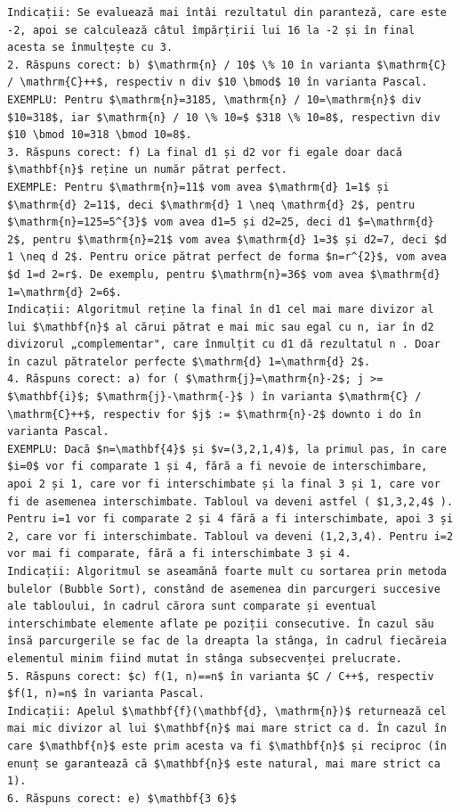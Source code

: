 \documentclass[10pt]{article}
\begin{document}
\begin{verbatim}
Indicații: Se evaluează mai întâi rezultatul din paranteză, care este -2, apoi se calculează câtul împărțirii lui 16 la -2 și în final acesta se înmulțește cu 3.
2. Răspuns corect: b) $\mathrm{n} / 10$ \% 10 în varianta $\mathrm{C} / \mathrm{C}++$, respectiv n div $10 \bmod$ 10 în varianta Pascal.
EXEMPLU: Pentru $\mathrm{n}=3185, \mathrm{n} / 10=\mathrm{n}$ div $10=318$, iar $\mathrm{n} / 10 \% 10=$ $318 \% 10=8$, respectivn div $10 \bmod 10=318 \bmod 10=8$.
3. Răspuns corect: f) La final d1 și d2 vor fi egale doar dacă $\mathbf{n}$ reține un număr pătrat perfect.
EXEMPLE: Pentru $\mathrm{n}=11$ vom avea $\mathrm{d} 1=1$ și $\mathrm{d} 2=11$, deci $\mathrm{d} 1 \neq \mathrm{d} 2$, pentru $\mathrm{n}=125=5^{3}$ vom avea d1=5 și d2=25, deci d1 $=\mathrm{d} 2$, pentru $\mathrm{n}=21$ vom avea $\mathrm{d} 1=3$ și d2=7, deci $d 1 \neq d 2$. Pentru orice pătrat perfect de forma $n=r^{2}$, vom avea $d 1=d 2=r$. De exemplu, pentru $\mathrm{n}=36$ vom avea $\mathrm{d} 1=\mathrm{d} 2=6$.
Indicații: Algoritmul reține la final în d1 cel mai mare divizor al lui $\mathbf{n}$ al cărui pătrat e mai mic sau egal cu n, iar în d2 divizorul „complementar", care înmulțit cu d1 dă rezultatul n . Doar în cazul pătratelor perfecte $\mathrm{d} 1=\mathrm{d} 2$.
4. Răspuns corect: a) for ( $\mathrm{j}=\mathrm{n}-2$; j >= $\mathbf{i}$; $\mathrm{j}-\mathrm{-}$ ) în varianta $\mathrm{C} / \mathrm{C}++$, respectiv for $j$ := $\mathrm{n}-2$ downto i do în varianta Pascal.
EXEMPLU: Dacă $n=\mathbf{4}$ și $v=(3,2,1,4)$, la primul pas, în care $i=0$ vor fi comparate 1 și 4, fără a fi nevoie de interschimbare, apoi 2 și 1, care vor fi interschimbate și la final 3 și 1, care vor fi de asemenea interschimbate. Tabloul va deveni astfel ( $1,3,2,4$ ). Pentru i=1 vor fi comparate 2 și 4 fără a fi interschimbate, apoi 3 și 2, care vor fi interschimbate. Tabloul va deveni (1,2,3,4). Pentru i=2 vor mai fi comparate, fără a fi interschimbate 3 și 4.
Indicații: Algoritmul se aseamănă foarte mult cu sortarea prin metoda bulelor (Bubble Sort), constând de asemenea din parcurgeri succesive ale tabloului, în cadrul cărora sunt comparate și eventual interschimbate elemente aflate pe poziții consecutive. În cazul său însă parcurgerile se fac de la dreapta la stânga, în cadrul fiecăreia elementul minim fiind mutat în stânga subsecvenței prelucrate.
5. Răspuns corect: $c) f(1, n)==n$ în varianta $C / C++$, respectiv $f(1, n)=n$ în varianta Pascal.
Indicații: Apelul $\mathbf{f}(\mathbf{d}, \mathrm{n})$ returnează cel mai mic divizor al lui $\mathbf{n}$ mai mare strict ca d. În cazul în care $\mathbf{n}$ este prim acesta va fi $\mathbf{n}$ și reciproc (în enunț se garantează că $\mathbf{n}$ este natural, mai mare strict ca 1).
6. Răspuns corect: e) $\mathbf{3 6}$


\end{verbatim}
\end{document}
